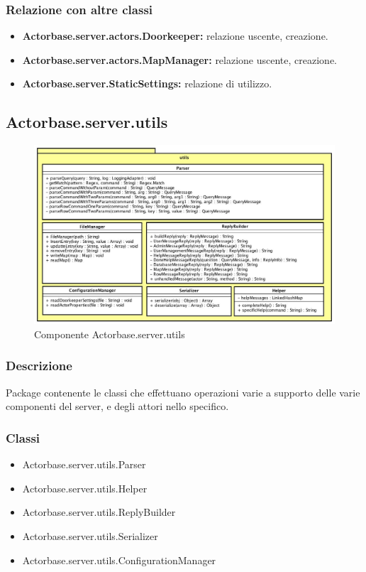 \documentclass[a4paper]{article}
\begin{document}
			\subsubsection{Relazione con altre classi}
				\begin{itemize}
					\item \textbf{Actorbase.server.actors.Doorkeeper:} relazione uscente, creazione.
					\item \textbf{Actorbase.server.actors.MapManager:} relazione uscente, creazione.
					\item \textbf{Actorbase.server.StaticSettings:} relazione di utilizzo.
				\end{itemize}
				
		\subsection{Actorbase.server.utils}
		
			\begin{figure} [H]
				\centering
				\includegraphics[width=\textwidth]{ST/Server/utilsLevel.jpg}
				\caption{Componente Actorbase.server.utils}
			\end{figure}
			
			\subsubsection{Descrizione}
				Package contenente le classi che effettuano operazioni varie a supporto delle varie componenti del server, e degli attori nello specifico.
				
			\subsubsection{Classi}
				\begin{itemize}
					\item Actorbase.server.utils.Parser
					\item Actorbase.server.utils.Helper
					\item Actorbase.server.utils.ReplyBuilder
					\item Actorbase.server.utils.Serializer
					\item Actorbase.server.utils.ConfigurationManager
				\end{itemize}
				
\end{document}
